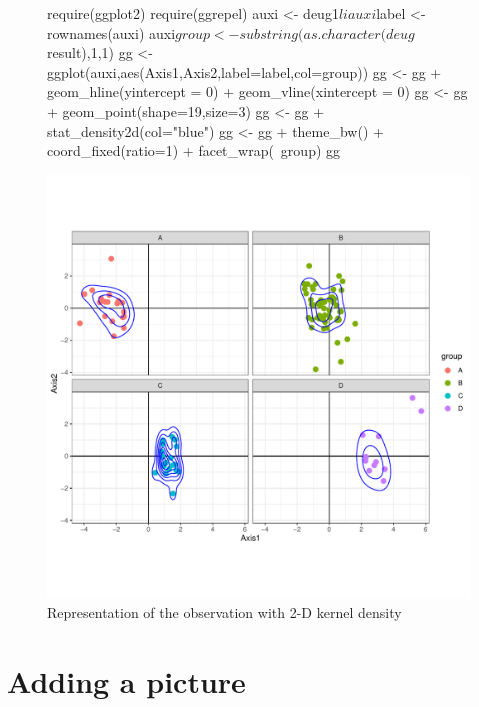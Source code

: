 \documentclass[a4paper,10pt]{article}
\begin{document}
\begin{figure}[H]
\begin{center}
\begin{Schunk}
\begin{Sinput}
  require(ggplot2)
  require(ggrepel)
  auxi <- deug1$li
  auxi$label <- rownames(auxi)
  auxi$group <- substring(as.character(deug$result),1,1)
  gg <- ggplot(auxi,aes(Axis1,Axis2,label=label,col=group))
  gg <- gg + geom_hline(yintercept = 0) + geom_vline(xintercept = 0)
  gg <- gg + geom_point(shape=19,size=3)
  gg <- gg + stat_density2d(col="blue")
  gg <-  gg + theme_bw() + coord_fixed(ratio=1) + facet_wrap(~group)
  gg
\end{Sinput}
\end{Schunk}
\includegraphics{figs/sweave-lidensity3}
\caption{Representation of the observation with 2-D kernel density}
\label{fig:lidensity3}
\end{center}
\end{figure}



\section{Adding a picture}
\end{document}
